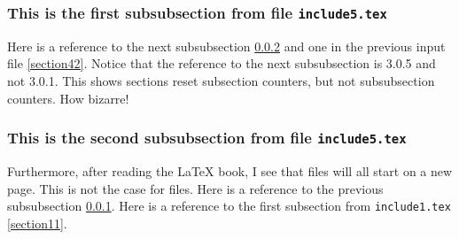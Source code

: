 \subsubsection{This is the first subsubsection from file \texttt{include5.tex}}
\label{section51}

Here is a reference to the next subsubsection \ref{section52} 
and one in the previous input file \ref{section42}.  Notice
that the reference to the next subsubsection is 3.0.5 and not
3.0.1.  This shows sections reset subsection counters, but not
subsubsection counters.  How bizarre!

\subsubsection{This is the second subsubsection from file \texttt{include5.tex}}
\label{section52}

Furthermore,
after reading the \LaTeX{} book, I see that \verb## 
files will all start on a new page.  This is not the case for
\verb## files.  Here is a reference to the previous subsubsection \ref{section51}.
Here is a reference to the first subsection from \texttt{include1.tex}
\ref{section11}.
